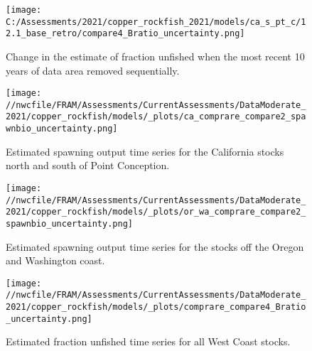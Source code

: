 \documentclass[11pt,
  english,
  a4paper,
]{article}
\begin{document}
\begin{figure}
\centering
\texttt{[image: C:/Assessments/2021/copper\_rockfish\_2021/models/ca\_s\_pt\_c/12.1\_base\_retro/compare4\_Bratio\_uncertainty.png]}
\caption{Change in the estimate of fraction unfished when the most recent 10 years of data area removed sequentially.\label{fig:retro-depl}}
\end{figure}

\tagmcend\tagstructend

\newpage


\begin{figure}
\centering
\texttt{[image: //nwcfile/FRAM/Assessments/CurrentAssessments/DataModerate\_2021/copper\_rockfish/models/\_plots/ca\_comprare\_compare2\_spawnbio\_uncertainty.png]}
\caption{Estimated spawning output time series for the California stocks north and south of Point Conception.\label{fig:ssb-ca-compare}}
\end{figure}

\tagmcend\tagstructend


\begin{figure}
\centering
\texttt{[image: //nwcfile/FRAM/Assessments/CurrentAssessments/DataModerate\_2021/copper\_rockfish/models/\_plots/or\_wa\_comprare\_compare2\_spawnbio\_uncertainty.png]}
\caption{Estimated spawning output time series for the stocks off the Oregon and Washington coast.\label{fig:ssb-orwa-compare}}
\end{figure}

\tagmcend\tagstructend


\begin{figure}
\centering
\texttt{[image: //nwcfile/FRAM/Assessments/CurrentAssessments/DataModerate\_2021/copper\_rockfish/models/\_plots/comprare\_compare4\_Bratio\_uncertainty.png]}
\caption{Estimated fraction unfished time series for all West Coast stocks.\label{fig:depl-compare}}
\end{figure}
\end{document}
